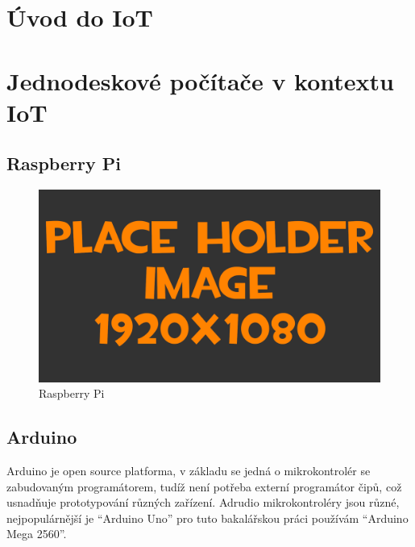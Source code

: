 
\section{Úvod do IoT}

\section{Jednodeskové počítače v kontextu IoT}

\subsection{Raspberry Pi}

\begin{figure}[h!]
	\centering
	\includegraphics[width=\textwidth]{pictures/placeHolderFHD.png}
    	\caption{Raspberry Pi}
   	\label{fig:rasPI}
\end{figure}

\subsection{Arduino}
Arduino je open source platforma, v základu se jedná o mikrokontrolér se zabudovaným programátorem, tudíž není potřeba externí programátor čipů, což usnadňuje prototypování různých zařízení. Adrudio mikrokontroléry jsou různé, nejpopulárnější je “Arduino Uno” pro tuto bakalářskou práci používám “Arduino Mega 2560”.

